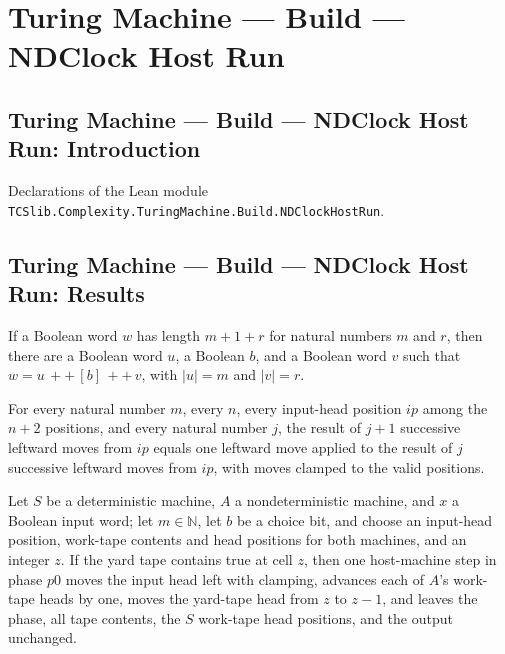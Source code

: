 \section{Turing Machine --- Build --- NDClock Host Run}
\subsection*{Turing Machine --- Build --- NDClock Host Run: Introduction}

Declarations of the Lean module \texttt{TCSlib.Complexity.TuringMachine.Build.NDClockHostRun}.

\subsection*{Turing Machine --- Build --- NDClock Host Run: Results}

\begin{theorem}
\label{Turing.ClockHost.exists_split_block}
\leanok
{}
If a Boolean word $w$ has length $m+1+r$ for natural numbers $m$ and $r$, then there are
a Boolean word $u$, a Boolean $b$, and a Boolean word $v$ such that $w=u \, ++ \, [b] \,
++ \, v$, with $|u|=m$ and $|v|=r$.
\end{theorem}

\begin{theorem}
\label{Turing.ClockHost.inLeft_succ}
\leanok
{}
For every natural number $m$, every $n$, every input-head position $ip$ among the $n+2$
positions, and every natural number $j$, the result of $j+1$ successive leftward moves
from $ip$ equals one leftward move applied to the result of $j$ successive leftward
moves from $ip$, with moves clamped to the valid positions.
\end{theorem}

\begin{theorem}
\label{Turing.ClockHost.p0_mark}
\leanok
{}
Let $S$ be a deterministic machine, $A$ a nondeterministic machine, and $x$ a Boolean
input word; let $m\in\mathbb N$, let $b$ be a choice bit, and choose an input-head
position, work-tape contents and head positions for both machines, and an integer $z$.
If the yard tape contains true at cell $z$, then one host-machine step in phase $p0$
moves the input head left with clamping, advances each of $A$’s work-tape heads by one,
moves the yard-tape head from $z$ to $z-1$, and leaves the phase, all tape contents, the
$S$ work-tape head positions, and the output unchanged.
\end{theorem}


